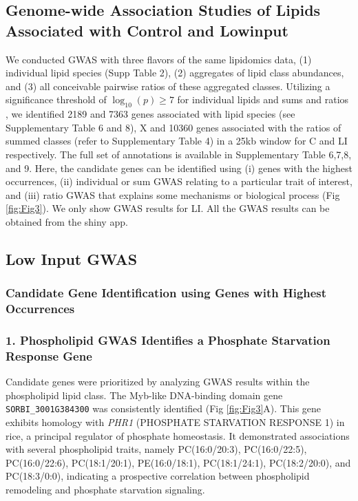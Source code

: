 \documentclass[10pt,letterpaper]{article}
\begin{document}
\begin{itemize}
\subsection*{Genome-wide Association Studies of Lipids Associated with Control and Lowinput}
We conducted GWAS with three flavors of the same lipidomics data, (1) individual lipid species (Supp Table 2), (2) aggregates of lipid class abundances, and (3) all conceivable pairwise ratios of these aggregated classes. Utilizing a significance threshold of $\log_{10}(p)\ge7$ for individual lipids and sums and ratios , we identified 2189 and 7363 genes associated with lipid species (see Supplementary Table 6 and 8), X and 10360  genes associated with the ratios of summed classes (refer to Supplementary Table 4) in a 25kb window for C and LI respectively. The full set of annotations is available in Supplementary Table 6,7,8, and 9. Here, the candidate genes can be identified using (i) genes with the highest occurrences, (ii) individual or sum GWAS relating to a particular trait of interest, and (iii) ratio GWAS that explains some mechanisms or biological process (Fig \ref{fig:Fig3}). We only show GWAS results for LI. All the GWAS results can be obtained from the shiny app.


\subsection*{Low Input GWAS}
\subsubsection*{Candidate Gene Identification using Genes with Highest Occurrences}
\subsubsection*{1. Phospholipid GWAS Identifies a Phosphate Starvation Response Gene}
Candidate genes were prioritized by analyzing GWAS results within the phospholipid lipid class. The Myb-like DNA-binding domain gene \texttt{SORBI\_3001G384300} was consistently identified (Fig \ref{fig:Fig3}A). This gene exhibits homology with \textit{PHR1} (PHOSPHATE STARVATION RESPONSE 1) in rice, a principal regulator of phosphate homeostasis. It demonstrated associations with several phospholipid traits, namely PC(16:0/20:3), PC(16:0/22:5), PC(16:0/22:6), PC(18:1/20:1), PE(16:0/18:1), PC(18:1/24:1), PC(18:2/20:0), and PC(18:3/0:0), indicating a prospective correlation between phospholipid remodeling and phosphate starvation signaling.


\end{itemize}
\end{document}

